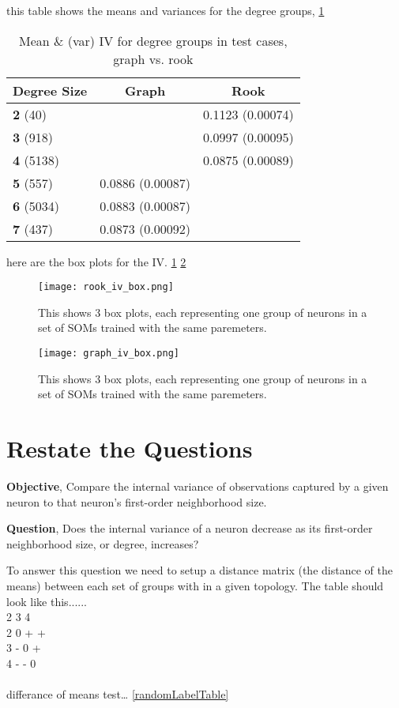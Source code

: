 this table shows the means and variances for the degree groups, \ref{meanvar1}


\begin{table}
\caption{Mean \& (var) IV for degree groups in test cases, graph vs. rook}
\label{meanvar1}
\begin{tabular}{|l|c|c|}
\hline
\textbf{Degree Size} & \textbf{Graph} & \textbf{Rook} \\
\hline
\textbf{2}   (40) & & 0.1123 (0.00074)  \\
\textbf{3}  (918) & & 0.0997 (0.00095)  \\
\textbf{4} (5138) & & 0.0875 (0.00089)  \\
\textbf{5}  (557) &   0.0886 (0.00087) &\\
\textbf{6} (5034) &   0.0883 (0.00087) &\\
\textbf{7}  (437) &   0.0873 (0.00092) &\\
\hline
\end{tabular} \end{table}



here are the box plots for the IV. \ref{fRookIV} \ref{fGraphIV}


\begin{figure}
\centering
\texttt{[image: rook\_iv\_box.png]}
\caption{This shows 3 box plots, each representing one group of neurons in a set
of SOMs trained with the same paremeters.}
\label{fRookIV}
\end{figure}

\begin{figure}
\centering
\texttt{[image: graph\_iv\_box.png]}
\caption{This shows 3 box plots, each representing one group of neurons in a set
of SOMs trained with the same paremeters.}
\label{fGraphIV}
\end{figure}



\section{Restate the Questions}
\textbf{Objective}, Compare the internal variance of observations captured by a given
neuron to that neuron's first-order neighborhood size.

\textbf{Question}, Does the internal variance of a neuron decrease as its first-order
neighborhood size, or degree, increases?


To answer this question we need to setup a distance matrix (the distance of the
means) between each set of groups with in a given topology.  The table should
look like this...... 
\\
  2 3 4\\
2 0 + +\\
3 - 0 +\\
4 - - 0\\
\\
differance of means test\ldots
\ref{randomLabelTable}


